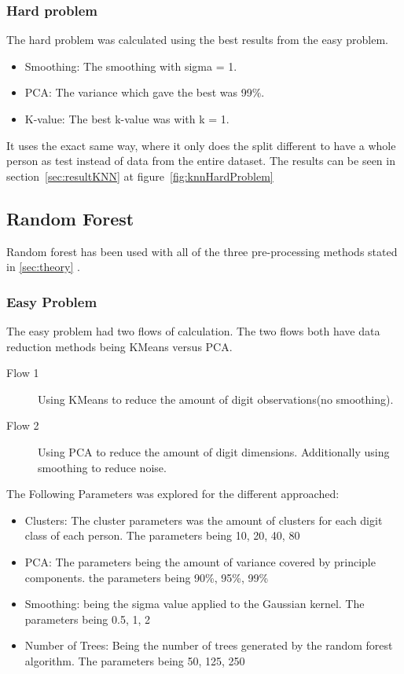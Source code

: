 \documentclass[report]{subfiles}
\begin{document}
\subsubsection{Hard problem}
The hard problem was calculated using the best results from the easy problem.
\begin{itemize}
  \item Smoothing: The smoothing with sigma = 1.
  \item PCA: The variance which gave the best was 99\%.
  \item K-value: The best k-value was with k = 1.
\end{itemize}
It uses the exact same way, where it only does the split different to have a whole person as test instead of data from the entire dataset.
The results can be seen in section~\ref{sec:resultKNN}  at figure~\ref{fig:knnHardProblem}

\subsection{Random Forest}
\label{sec:impRandomForest}
Random forest has been used with all of the three pre-processing methods stated in \ref{sec:theory} .

\subsubsection{Easy Problem}
\label{sec:implRF:easyProblem}

The easy problem had two flows of calculation. The two flows both have data reduction methods being KMeans versus PCA.

\begin{description}
\item[Flow 1] Using KMeans to reduce the amount of digit observations(no smoothing).
\item[Flow 2] Using PCA to reduce the amount of digit dimensions. Additionally using smoothing to reduce noise.
\end{description}

The Following Parameters was explored for the different approached:
\begin{itemize}
\item Clusters: The cluster parameters was the amount of clusters for each digit class of each person. The parameters being {10, 20, 40, 80}
\item PCA: The parameters being the amount of variance covered by principle components. the parameters being {90\%, 95\%, 99\%}
\item Smoothing: being the sigma value applied to the Gaussian kernel. The parameters being {0.5, 1, 2}
\item Number of Trees: Being the number of trees generated by the random forest algorithm. The parameters being {50, 125, 250}
\end{itemize}
\end{document}
